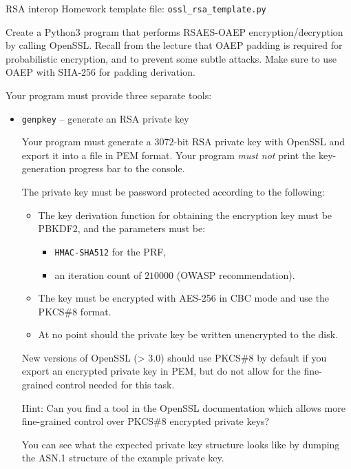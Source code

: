 \documentclass{homework}
\begin{document}
\begin{task}{RSA interop}
  Homework template file: \texttt{ossl\_rsa\_template.py}

  Create a Python3 program that performs RSAES-OAEP encryption/decryption by calling OpenSSL.
  Recall from the lecture that OAEP padding is required for probabilistic encryption, and to prevent some subtle attacks.
  Make sure to use OAEP with SHA-256 for padding derivation.

  Your program must provide three separate tools:
  \begin{itemize}
    \item \texttt{genpkey} -- generate an RSA private key

    Your program must generate a $3072$-bit RSA private key with OpenSSL and export it into a file in PEM format.
    Your program \emph{must not} print the key-generation progress bar to the console.

    The private key must be password protected according to the following:
    \begin{itemize}
      \item The key derivation function for obtaining the encryption key must be PBKDF2, and the parameters must be:
      \begin{itemize}
        \item \texttt{HMAC-SHA512} for the PRF,
        \item an iteration count of $210000$ (OWASP recommendation).
      \end{itemize}
      \item The key must be encrypted with AES-256 in CBC mode and use the PKCS\#8 format.
      \item At no point should the private key be written unencrypted to the disk.
    \end{itemize}

    \begin{tcolorbox}[title=Note]
      New versions of OpenSSL (> 3.0) should use PKCS\#8 by default if you export an encrypted private key in PEM, but do not allow for the fine-grained control needed for this task.

      Hint: Can you find a tool in the OpenSSL documentation which allows more fine-grained control over PKCS\#8 encrypted private keys? 
    \end{tcolorbox}

    You can see what the expected private key structure looks like by dumping the ASN.1 structure of the example private key.


\end{itemize}
\end{task}
\end{document}
